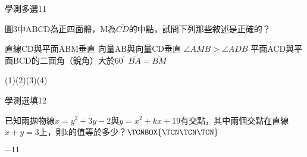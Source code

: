 \begin{QUESTIONS}
\begin{QUESTION}
\begin{ExamInfo}{84}{學測}{多選}{11}
        \end{ExamInfo}
        \begin{ExamAnsRateInfo}{}{}{}{}
        \end{ExamAnsRateInfo}
        \begin{QBODY}
            圖3中ABCD為正四面體，M為$\overline{CD}$的中點，試問下列那些敘述是正確的？
            \begin{QOPS}
            \QOP 直線CD與平面ABM垂直
            \QOP 向量AB與向量CD垂直
            \QOP $\angle AMB>\angle ADB$
            \QOP 平面ACD與平面BCD的二面角（銳角）大於${{60}^{{}^\circ }}$
            \QOP $\overline{BA}=\overline{BM}$
            \end{QOPS}
        \end{QBODY}
        \begin{QFROMS}
        \end{QFROMS}
        \begin{QTAGS}\end{QTAGS}
        \begin{QANS}
            (1)(2)(3)(4)
        \end{QANS}
        \begin{QSOLLIST}
        \end{QSOLLIST}
        \begin{QEMPTYSPACE}
        \end{QEMPTYSPACE}
    \end{QUESTION}
\end{QUESTIONS}\begin{QUESTIONS}
    \begin{QUESTION}
        \begin{ExamInfo}{84}{學測}{選填}{12}
        \end{ExamInfo}
        \begin{ExamAnsRateInfo}{}{}{}{}
        \end{ExamAnsRateInfo}
        \begin{QBODY}
            已知兩拋物線$x={{y}^{2}}+3y-2$與$y={{x}^{2}}+kx+19$有交點，其中兩個交點在直線$x+y=3$上，則k的值等於多少？$\TCNBOX{\TCN\TCN\TCN}$
        \end{QBODY}
        \begin{QFROMS}
        \end{QFROMS}
        \begin{QTAGS}\end{QTAGS}
        \begin{QANS}
            $-11$
        \end{QANS}

\end{QUESTION}
\end{QUESTIONS}
